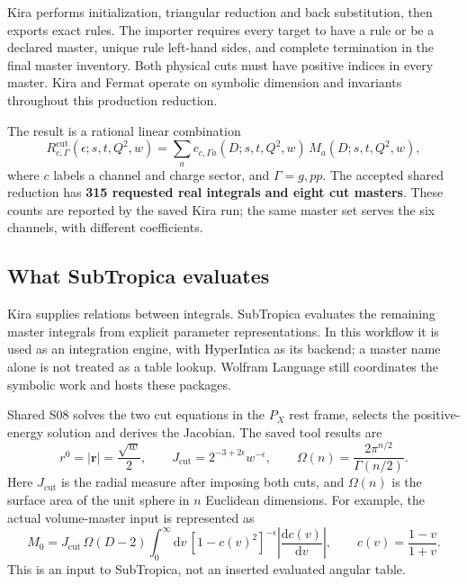 \documentclass[11pt,a4paper]{article}
\newcommand{\dd}{\mathrm{d}}
\newcommand{\eps}{\epsilon}
\newcommand{\cut}{\mathrm{cut}}
\begin{document}
Kira performs initialization, triangular reduction and back substitution,
then exports exact rules. The importer requires every target to have a
rule or be a declared master, unique rule left-hand sides, and complete
termination in the final master inventory. Both physical cuts must have
positive indices in every master. Kira and Fermat operate on symbolic
dimension and invariants throughout this production reduction.

The result is a rational linear combination
\begin{equation}
 R_{c,\Gamma}^{\cut}(\eps;s,t,Q^2,w)
 =\sum_a c_{c,\Gamma a}(D;s,t,Q^2,w)\,M_a(D;s,t,Q^2,w),
 \label{eq:realreduction}
\end{equation}
where $c$ labels a channel and charge sector, and $\Gamma=g,pp$.
The accepted shared reduction has \textbf{315 requested real integrals
and eight cut masters}. These counts are reported by the saved Kira run;
the same master set serves the six channels, with different coefficients.

\subsection{What SubTropica evaluates}

Kira supplies relations between integrals. SubTropica evaluates the
remaining master integrals from explicit parameter representations.
In this workflow it is used as an integration engine, with HyperIntica as
its backend; a master name alone is not treated as a table lookup.
Wolfram Language still coordinates the symbolic work and hosts these
packages.

Shared S08 solves the two cut equations in the $P_X$ rest frame,
selects the positive-energy solution and derives the Jacobian. The saved
tool results are
\begin{equation}
 r^0=|\boldsymbol r|=\frac{\sqrt w}{2},\qquad
 J_{\cut}=2^{-3+2\eps}w^{-\eps},\qquad
 \Omega(n)=\frac{2\pi^{n/2}}{\Gamma(n/2)}.
 \label{eq:cutjacobian}
\end{equation}
Here $J_{\cut}$ is the radial measure after imposing both cuts, and
$\Omega(n)$ is the surface area of the unit sphere in $n$ Euclidean
dimensions. For example, the actual volume-master input is represented as
\begin{equation}
 M_0=J_{\cut}\,\Omega(D-2)
 \int_0^\infty\dd v\,
 [1-c(v)^2]^{-\eps}\left|\frac{\dd c(v)}{\dd v}\right|,
 \qquad c(v)=\frac{1-v}{1+v}.
 \label{eq:volumeinput}
\end{equation}
This is an input to SubTropica, not an inserted evaluated angular table.
\end{document}
